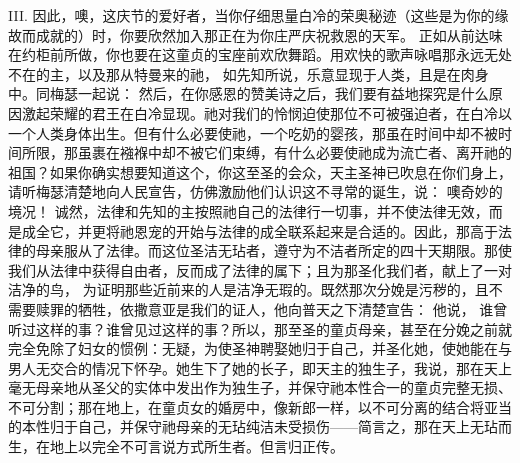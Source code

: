 III. 因此，噢，这庆节的爱好者，当你仔细思量白冷的荣奥秘迹（这些是为你的缘故而成就的）时，你要欣然加入那正在为你庄严庆祝救恩的天军。 正如从前达味在约柜前所做，你也要在这童贞的宝座前欢欣舞蹈。用欢快的歌声咏唱那永远无处不在的主，以及那从特曼来的祂， 如先知所说，乐意显现于人类，且是在肉身中。同梅瑟一起说：  然后，在你感恩的赞美诗之后，我们要有益地探究是什么原因激起荣耀的君王在白冷显现。祂对我们的怜悯迫使那位不可被强迫者，在白冷以一个人类身体出生。但有什么必要使祂，一个吃奶的婴孩，那虽在时间中却不被时间所限，那虽裹在襁褓中却不被它们束缚，有什么必要使祂成为流亡者、离开祂的祖国？如果你确实想要知道这个，你这至圣的会众，天主圣神已吹息在你们身上，请听梅瑟清楚地向人民宣告，仿佛激励他们认识这不寻常的诞生，说：  噢奇妙的境况！  诚然，法律和先知的主按照祂自己的法律行一切事，并不使法律无效，而是成全它，并更将祂恩宠的开始与法律的成全联系起来是合适的。因此，那高于法律的母亲服从了法律。而这位圣洁无玷者，遵守为不洁者所定的四十天期限。那使我们从法律中获得自由者，反而成了法律的属下；且为那圣化我们者，献上了一对洁净的鸟， 为证明那些近前来的人是洁净无瑕的。既然那次分娩是污秽的，且不需要赎罪的牺牲，依撒意亚是我们的证人，他向普天之下清楚宣告： 他说，  谁曾听过这样的事？谁曾见过这样的事？所以，那至圣的童贞母亲，甚至在分娩之前就完全免除了妇女的惯例：无疑，为使圣神聘娶她归于自己，并圣化她，使她能在与男人无交合的情况下怀孕。她生下了她的长子，即天主的独生子，我说，那在天上毫无母亲地从圣父的实体中发出作为独生子，并保守祂本性合一的童贞完整无损、不可分割；那在地上，在童贞女的婚房中，像新郎一样，以不可分离的结合将亚当的本性归于自己，并保守祂母亲的无玷纯洁未受损伤——简言之，那在天上无玷而生，在地上以完全不可言说方式所生者。但言归正传。\par

